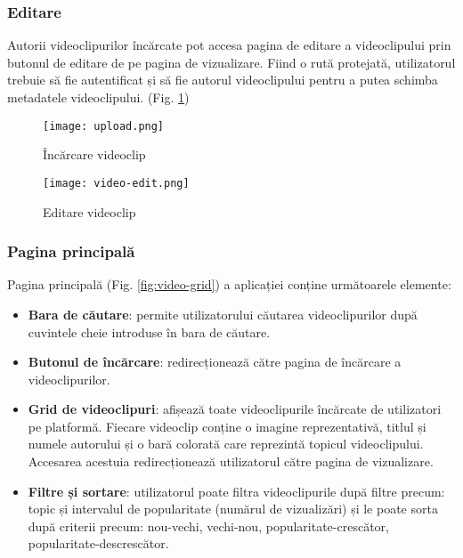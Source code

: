 \subsubsection{Editare}
Autorii videoclipurilor încărcate pot accesa pagina de editare a videoclipului prin butonul
de editare de pe pagina de vizualizare. Fiind o rută protejată, utilizatorul trebuie să fie
autentificat și să fie autorul videoclipului pentru a putea schimba metadatele videoclipului.
(Fig. \ref{fig:video-edit})

\begin{figure}[h]
    \centering
    \begin{minipage}{0.49\textwidth}
        \centering
        \texttt{[image: upload.png]}
        \caption{Încărcare videoclip}
        \label{fig:upload}
    \end{minipage}\hfill
    \begin{minipage}{0.49\textwidth}
        \centering
        \texttt{[image: video-edit.png]}
        \caption{Editare videoclip}
        \label{fig:video-edit}
    \end{minipage}
\end{figure}

\subsubsection{Pagina principală}
Pagina principală (Fig. \ref{fig:video-grid}) a aplicației conține următoarele elemente:
\begin{itemize}
    \item \textbf{Bara de căutare}: permite utilizatorului căutarea videoclipurilor după cuvintele
    cheie introduse în bara de căutare.
    \item \textbf{Butonul de încărcare}: redirecționează către pagina de încărcare a videoclipurilor.
    \item \textbf{Grid de videoclipuri}: afișează toate videoclipurile încărcate de utilizatori pe
    platformă. Fiecare videoclip conține o imagine reprezentativă, titlul și numele autorului și o 
    bară colorată care reprezintă topicul videoclipului. Accesarea acestuia redirecționează utilizatorul
    către pagina de vizualizare.
    \item \textbf{Filtre și sortare}: utilizatorul poate filtra videoclipurile după filtre precum: topic 
    și intervalul de popularitate (numărul de vizualizări) și le poate sorta după criterii precum: nou-vechi,
    vechi-nou, popularitate-crescător, popularitate-descrescător.
\end{itemize}

